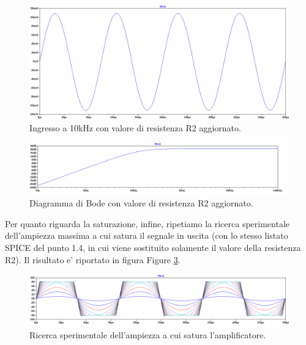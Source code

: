 \documentclass[a4paper,10pt]{article}
\begin{document}
\begin{figure}[h!]
	\centering
 	\includegraphics[width=0.6\linewidth]{plot1-5-3.png}
  	\caption{Ingresso a 10kHz con valore di resistenza R2 aggiornato.}
  	\label{fig:plot10khzr2}
\end{figure}

\begin{figure}[h!]
	\centering
 	\includegraphics[width=1\linewidth]{plot-1-5-bode.png}
  	\caption{Diagramma di Bode con valore di resistenza R2 aggiornato.}
  	\label{fig:plotboder2}
\end{figure}

\pagebreak
Per quanto riguarda la saturazione, infine, ripetiamo la ricerca sperimentale dell'ampiezza massima a cui satura il segnale in uscita (con lo stesso listato SPICE del punto 1.4, in cui viene sostituito solamente il valore della resistenza R2). Il risultato e' riportato in figura Figure \ref{fig:plotsatr2}.

\begin{figure}[h!]
	\centering
 	\includegraphics[width=1\linewidth]{plot-1-5-sat.png}
  	\caption{Ricerca sperimentale dell'ampiezza a cui satura l'amplificatore.}
  	\label{fig:plotsatr2}
\end{figure}
\end{document}
